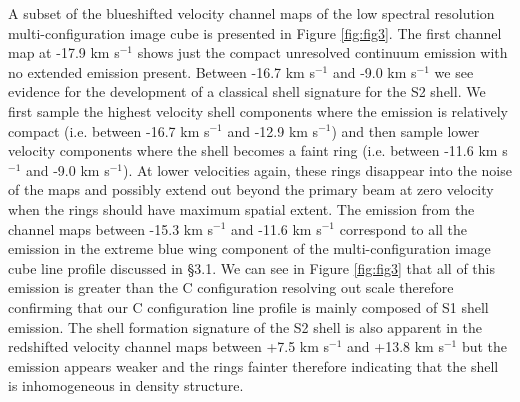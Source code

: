 \documentclass[iop]{emulateapj}
\begin{document}
A subset of the blueshifted velocity channel maps of the low spectral resolution multi-configuration image cube is presented in Figure \ref{fig:fig3}. The first channel map at -17.9 km s${}^{-1}$ shows just the compact unresolved continuum emission with no extended emission present. Between -16.7 km s${}^{-1}$ and -9.0 km s${}^{-1}$ we see evidence for the development of a classical shell signature for the S2 shell. We first sample the highest velocity shell components where the emission is relatively compact (i.e. between -16.7 km s${}^{-1}$ and -12.9 km s${}^{-1}$) and then sample lower velocity components where the shell becomes a faint ring (i.e. between -11.6 km s${}^{-1}$ and -9.0 km s${}^{-1}$). At lower velocities again, these rings disappear into the noise of the maps and possibly extend out beyond the primary beam at zero velocity when the rings should have maximum spatial extent. The emission from the channel maps between -15.3 km s${}^{-1}$ and -11.6 km s${}^{-1}$ correspond to all the emission in the extreme blue wing component of the multi-configuration image cube line profile discussed in \S3.1. We can see in Figure \ref{fig:fig3} that all of this emission is greater than the C configuration resolving out scale therefore confirming that our C configuration line profile is mainly composed of S1 shell emission. The shell formation signature of the S2 shell is also apparent in the redshifted velocity channel maps between +7.5 km s${}^{-1}$ and +13.8 km s${}^{-1}$ but the emission appears weaker and the rings fainter therefore indicating that the shell is inhomogeneous in density structure. 
\end{document}
